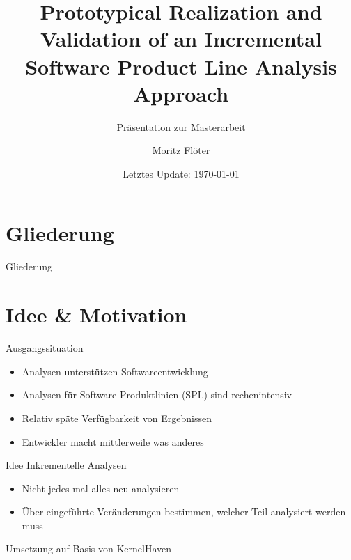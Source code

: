 \documentclass[aspectratio=43, noserifmath]{beamer}
\title{Prototypical Realization and Validation of an Incremental Software Product Line Analysis Approach}
\subtitle{Pr\"asentation zur Masterarbeit}
\date{Letztes Update: \today}
\author{Moritz Fl\"oter}
\institute{\textbf{Universit\"at Hildesheim}}
\begin{document}

\maketitle


\section*{Gliederung}
\begin{frame}{Gliederung}
	\tableofcontents[hideallsubsections]

\end{frame}


\section{Idee \& Motivation}

\begin{frame}{Ausgangssituation}
\begin{itemize}
        \item[\textbullet] Analysen unterst\"utzen Softwareentwicklung
        \item[\textbullet] Analysen f\"ur Software Produktlinien (SPL) sind rechenintensiv \cite{Thum:2014:CSA:2620784.2580950}
        \item[\textbullet] Relativ sp\"ate Verf\"ugbarkeit von Ergebnissen
        \item[\textbullet] Entwickler macht mittlerweile was anderes
\end{itemize}
\end{frame}


\begin{frame}{Idee}
Inkrementelle Analysen
\begin{itemize}
    \item[\textbullet] Nicht jedes mal alles neu analysieren
    \item[\textbullet] \"Uber eingef\"uhrte Ver\"anderungen bestimmen, welcher Teil analysiert werden muss 
\end{itemize}

Umsetzung auf Basis von KernelHaven

\end{frame}
\end{document}
